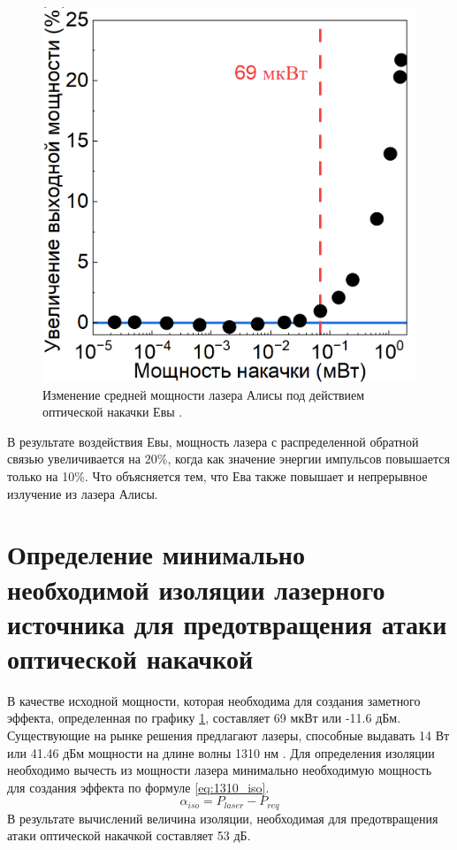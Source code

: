 \begin{figure}
    \centering
    \includegraphics{images/1310_мощность.png}
    \caption{Изменение средней мощности лазера Алисы под действием оптической накачки Евы \cite{fadeev2025}.}
    \label{fig:avg pwr 1310 ch4}
\end{figure}
В результате воздействия Евы, мощность лазера с распределенной обратной связью увеличивается на $20\%$, когда как значение энергии импульсов повышается только на 10\%. Что объясняется тем, что Ева также повышает и непрерывное излучение из лазера Алисы.
\section{Определение минимально необходимой изоляции лазерного источника для предотвращения атаки оптической накачкой}\label{sec:ch4/sect5}
В качестве исходной мощности, которая необходима для создания заметного эффекта, определенная по графику \ref{fig:avg pwr 1310 ch4}, составляет 69 мкВт или -11.6 дБм. Существующие на рынке решения предлагают лазеры, способные выдавать 14 Вт или 41.46 дБм мощности на длине волны 1310 нм \cite{grimes2022}.
Для определения изоляции необходимо вычесть из мощности лазера минимально необходимую мощность для создания эффекта по формуле \ref{eq:1310_iso}.
\begin{equation}
\label{eq:1310_iso}
    \alpha_{iso} = P_{laser} - P_{req}
\end{equation}
В результате вычислений величина изоляции, необходимая для предотвращения атаки оптической накачкой составляет 53 дБ. 

